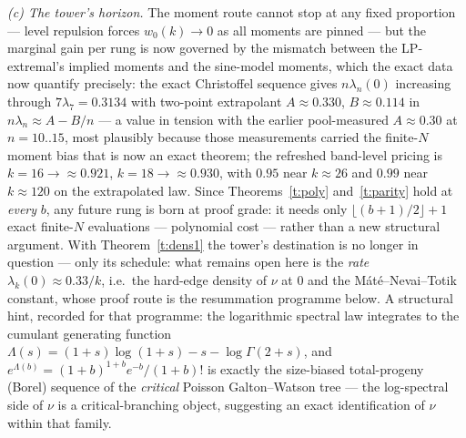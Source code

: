 \documentclass[11pt]{article}
\numberwithin{equation}{section}
\theoremstyle{definition}
\theoremstyle{remark}
\begin{document}
\emph{(c) The tower's horizon.} The moment route cannot stop
at any fixed proportion --- level repulsion forces
$w_0(k)\to0$ as all moments are pinned --- but the marginal
gain per rung is now governed by the mismatch between the
LP-extremal's implied moments and the sine-model moments,
which the exact data now quantify precisely: the exact
Christoffel sequence gives $n\lambda_n(0)$ increasing through
$7\lambda_7=0.3134$ with two-point extrapolant
$A\approx0.330$, $B\approx0.114$ in
$n\lambda_n\approx A-B/n$ --- a value in tension with the
earlier pool-measured $A\approx0.30$ at $n=10..15$, most
plausibly because those measurements carried the finite-$N$
moment bias that is now an exact theorem; the refreshed
band-level pricing is $k=16\to\approx0.921$,
$k=18\to\approx0.930$, with $0.95$ near $k\approx26$ and
$0.99$ near $k\approx120$ on the extrapolated law. Since
Theorems~\ref{t:poly} and~\ref{t:parity} hold at \emph{every}
$b$, any future rung is born at proof grade: it needs only
$\lfloor(b{+}1)/2\rfloor+1$ exact finite-$N$ evaluations ---
polynomial cost --- rather than a new structural argument.
With Theorem~\ref{t:dens1} the tower's destination is no
longer in question --- only its schedule: what remains open
here is the \emph{rate} $\lambda_k(0)\approx0.33/k$, i.e.\
the hard-edge density of $\nu$ at $0$ and the
Máté--Nevai--Totik constant, whose proof route is the
resummation programme below. A structural hint, recorded for
that programme: the logarithmic spectral law integrates to
the cumulant generating function
$\Lambda(s)=(1{+}s)\log(1{+}s)-s-\log\Gamma(2{+}s)$, and
$e^{\Lambda(b)}=(1{+}b)^{1+b}e^{-b}/(1{+}b)!$ is exactly the
size-biased total-progeny (Borel) sequence of the
\emph{critical} Poisson Galton--Watson tree --- the
log-spectral side of $\nu$ is a critical-branching object,
suggesting an exact identification of $\nu$ within that
family.
\end{document}
